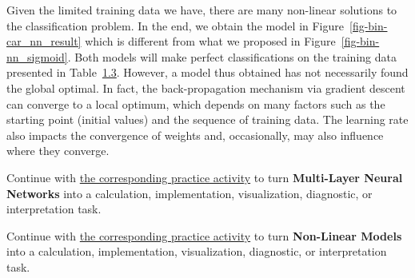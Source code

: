 \documentclass[
  letterpaper,
]{scrbook}
\begin{document}
Given the limited training data we have, there are many non-linear
solutions to the classification problem. In the end, we obtain the model
in Figure~\ref{fig-bin-car_nn_result} which is different from what we
proposed in Figure~\ref{fig-bin-nn_sigmoid}. Both models will make
perfect classifications on the training data presented in
Table~\hyperref[tab-bin-car_nn]{1.3}. However, a model thus obtained has
not necessarily found the global optimal. In fact, the back-propagation
mechanism via gradient descent can converge to a local optimum, which
depends on many factors such as the starting point (initial values) and
the sequence of training data. The learning rate also impacts the
convergence of weights and, occasionally, may also influence where they
converge.

\begin{tcolorbox}[enhanced jigsaw, arc=.35mm, bottomrule=.15mm, bottomtitle=1mm, breakable, colback=white, colbacktitle=quarto-callout-tip-color!10!white, colframe=quarto-callout-tip-color-frame, coltitle=black, left=2mm, leftrule=.75mm, opacityback=0, opacitybacktitle=0.6, rightrule=.15mm, title=\textcolor{quarto-callout-tip-color}{\faLightbulb}\hspace{0.5em}{Put it into practice}, titlerule=0mm, toprule=.15mm, toptitle=1mm]

Continue with \hyperref[sec-pr-07-multi-layer-neural-networks]{the
corresponding practice activity} to turn \textbf{Multi-Layer Neural
Networks} into a calculation, implementation, visualization, diagnostic,
or interpretation task.

\end{tcolorbox}

\begin{tcolorbox}[enhanced jigsaw, arc=.35mm, bottomrule=.15mm, bottomtitle=1mm, breakable, colback=white, colbacktitle=quarto-callout-tip-color!10!white, colframe=quarto-callout-tip-color-frame, coltitle=black, left=2mm, leftrule=.75mm, opacityback=0, opacitybacktitle=0.6, rightrule=.15mm, title=\textcolor{quarto-callout-tip-color}{\faLightbulb}\hspace{0.5em}{Put it into practice}, titlerule=0mm, toprule=.15mm, toptitle=1mm]

Continue with \hyperref[sec-pr-07-non-linear-models]{the corresponding
practice activity} to turn \textbf{Non-Linear Models} into a
calculation, implementation, visualization, diagnostic, or
interpretation task.

\end{tcolorbox}
\end{document}
